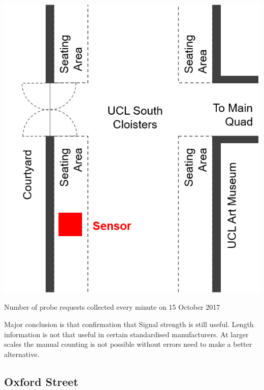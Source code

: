 \begin{marginfigure}
  \forceversofloat
  \includegraphics[trim={5 5 5 5},clip]{images/south-cloisters.png}
  \caption{Number of probe requests collected every minute on 15 October 2017}
  \label{figure:collection:ucl:config}
\end{marginfigure}

Major conclusion is that confirmation that Signal strength is still useful.
Length information is not that useful in certain standardised manufacturers.
At larger scales the manual counting is not possible without errors need to make a better alternative.

\subsection{Oxford Street}

